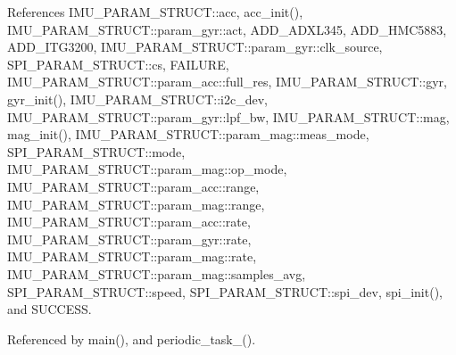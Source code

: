 References I\-M\-U\-\_\-\-P\-A\-R\-A\-M\-\_\-\-S\-T\-R\-U\-C\-T\-::acc, acc\-\_\-init(), I\-M\-U\-\_\-\-P\-A\-R\-A\-M\-\_\-\-S\-T\-R\-U\-C\-T\-::param\-\_\-gyr\-::act, A\-D\-D\-\_\-\-A\-D\-X\-L345, A\-D\-D\-\_\-\-H\-M\-C5883, A\-D\-D\-\_\-\-I\-T\-G3200, I\-M\-U\-\_\-\-P\-A\-R\-A\-M\-\_\-\-S\-T\-R\-U\-C\-T\-::param\-\_\-gyr\-::clk\-\_\-source, S\-P\-I\-\_\-\-P\-A\-R\-A\-M\-\_\-\-S\-T\-R\-U\-C\-T\-::cs, F\-A\-I\-L\-U\-R\-E, I\-M\-U\-\_\-\-P\-A\-R\-A\-M\-\_\-\-S\-T\-R\-U\-C\-T\-::param\-\_\-acc\-::full\-\_\-res, I\-M\-U\-\_\-\-P\-A\-R\-A\-M\-\_\-\-S\-T\-R\-U\-C\-T\-::gyr, gyr\-\_\-init(), I\-M\-U\-\_\-\-P\-A\-R\-A\-M\-\_\-\-S\-T\-R\-U\-C\-T\-::i2c\-\_\-dev, I\-M\-U\-\_\-\-P\-A\-R\-A\-M\-\_\-\-S\-T\-R\-U\-C\-T\-::param\-\_\-gyr\-::lpf\-\_\-bw, I\-M\-U\-\_\-\-P\-A\-R\-A\-M\-\_\-\-S\-T\-R\-U\-C\-T\-::mag, mag\-\_\-init(), I\-M\-U\-\_\-\-P\-A\-R\-A\-M\-\_\-\-S\-T\-R\-U\-C\-T\-::param\-\_\-mag\-::meas\-\_\-mode, S\-P\-I\-\_\-\-P\-A\-R\-A\-M\-\_\-\-S\-T\-R\-U\-C\-T\-::mode, I\-M\-U\-\_\-\-P\-A\-R\-A\-M\-\_\-\-S\-T\-R\-U\-C\-T\-::param\-\_\-mag\-::op\-\_\-mode, I\-M\-U\-\_\-\-P\-A\-R\-A\-M\-\_\-\-S\-T\-R\-U\-C\-T\-::param\-\_\-acc\-::range, I\-M\-U\-\_\-\-P\-A\-R\-A\-M\-\_\-\-S\-T\-R\-U\-C\-T\-::param\-\_\-mag\-::range, I\-M\-U\-\_\-\-P\-A\-R\-A\-M\-\_\-\-S\-T\-R\-U\-C\-T\-::param\-\_\-acc\-::rate, I\-M\-U\-\_\-\-P\-A\-R\-A\-M\-\_\-\-S\-T\-R\-U\-C\-T\-::param\-\_\-gyr\-::rate, I\-M\-U\-\_\-\-P\-A\-R\-A\-M\-\_\-\-S\-T\-R\-U\-C\-T\-::param\-\_\-mag\-::rate, I\-M\-U\-\_\-\-P\-A\-R\-A\-M\-\_\-\-S\-T\-R\-U\-C\-T\-::param\-\_\-mag\-::samples\-\_\-avg, S\-P\-I\-\_\-\-P\-A\-R\-A\-M\-\_\-\-S\-T\-R\-U\-C\-T\-::speed, S\-P\-I\-\_\-\-P\-A\-R\-A\-M\-\_\-\-S\-T\-R\-U\-C\-T\-::spi\-\_\-dev, spi\-\_\-init(), and S\-U\-C\-C\-E\-S\-S.



Referenced by main(), and periodic\-\_\-task\-\_().


